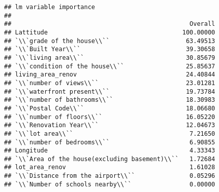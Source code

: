 \documentclass[
]{article}
\begin{document}
\begin{verbatim}
## lm variable importance
## 
##                                                 Overall
## Lattitude                                     100.00000
## `\\`grade of the house\\``                     63.49513
## `\\`Built Year\\``                             39.30658
## `\\`living area\\``                            30.85679
## `\\`condition of the house\\``                 25.85637
## living_area_renov                              24.40844
## `\\`number of views\\``                        23.01281
## `\\`waterfront present\\``                     19.73784
## `\\`number of bathrooms\\``                    18.30983
## `\\`Postal Code\\``                            18.06680
## `\\`number of floors\\``                       16.05220
## `\\`Renovation Year\\``                        12.04673
## `\\`lot area\\``                                7.21650
## `\\`number of bedrooms\\``                      6.90855
## Longitude                                       4.33343
## `\\`Area of the house(excluding basement)\\``   1.72684
## lot_area_renov                                  1.61028
## `\\`Distance from the airport\\``               0.05296
## `\\`Number of schools nearby\\``                0.00000
\end{verbatim}
\end{document}
